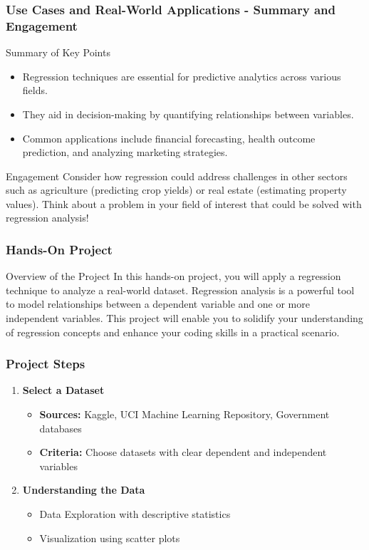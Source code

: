 \documentclass[aspectratio=169]{beamer}
\begin{document}
\begin{frame}[fragile]
    \frametitle{Use Cases and Real-World Applications - Summary and Engagement}
    \begin{block}{Summary of Key Points}
        \begin{itemize}
            \item Regression techniques are essential for predictive analytics across various fields.
            \item They aid in decision-making by quantifying relationships between variables.
            \item Common applications include financial forecasting, health outcome prediction, and analyzing marketing strategies.
        \end{itemize}
    \end{block}
    
    \begin{block}{Engagement}
        Consider how regression could address challenges in other sectors such as agriculture (predicting crop yields) or real estate (estimating property values). Think about a problem in your field of interest that could be solved with regression analysis!
    \end{block}
\end{frame}

\begin{frame}
    \frametitle{Hands-On Project}
    \begin{block}{Overview of the Project}
        In this hands-on project, you will apply a regression technique to analyze a real-world dataset. 
        Regression analysis is a powerful tool to model relationships between a dependent variable and one or more independent variables. 
        This project will enable you to solidify your understanding of regression concepts and enhance your coding skills in a practical scenario.
    \end{block}
\end{frame}

\begin{frame}
    \frametitle{Project Steps}
    \begin{enumerate}
        \item \textbf{Select a Dataset}
            \begin{itemize}
                \item \textbf{Sources:} Kaggle, UCI Machine Learning Repository, Government databases
                \item \textbf{Criteria:} Choose datasets with clear dependent and independent variables
            \end{itemize}

        \item \textbf{Understanding the Data}
            \begin{itemize}
                \item Data Exploration with descriptive statistics
                \item Visualization using scatter plots
            \end{itemize}
    \end{enumerate}
\end{frame}
\end{document}
